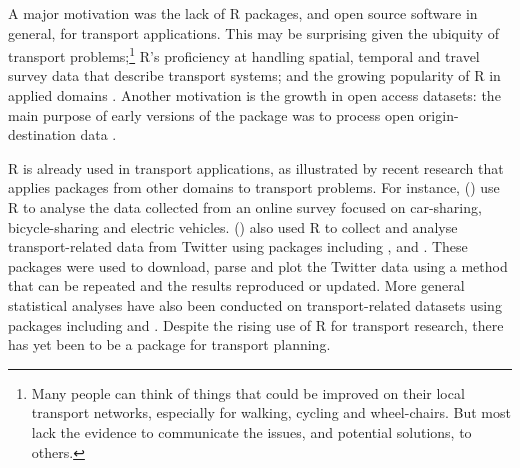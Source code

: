 
A major motivation was the lack of R packages, and open source software in general, for transport applications.
This may be surprising given the ubiquity of transport problems;\footnote{
Many people can think of things that could be improved on their local transport networks, especially for walking, cycling and wheel-chairs.
  But most lack the evidence to communicate the issues, and potential solutions, to others.
  }
R's proficiency at handling spatial, temporal and travel survey data that describe transport systems;
and the growing popularity of R in applied domains \citep{jalal_overview_2017,moore_why_2017}.
Another motivation is the growth in open access datasets:
the main purpose of early versions of the package was to process open origin-destination data \citep{lovelace_propensity_2017}.

%

R is already used in transport applications, as illustrated by recent
research that applies packages from other domains to transport problems.
For instance, \citeauthor{efthymiou_use_2012}
(\citeyear{efthymiou_use_2012}) use R to analyse the data collected from
an online survey focused on car-sharing, bicycle-sharing and electric
vehicles. \citeauthor{efthymiou_use_2012}
(\citeyear{efthymiou_use_2012}) also used R to collect and analyse
transport-related data from Twitter using packages including
,  and . These packages
were used to download, parse and plot the Twitter data using a method
that can be repeated and the results reproduced or updated. More general
statistical analyses have also been conducted on transport-related
datasets using packages including  and 
\citep{diana_studying_2012,cerin_walking_2013}. Despite the rising use
of R for transport research, there has yet been to be a package for
transport planning.

